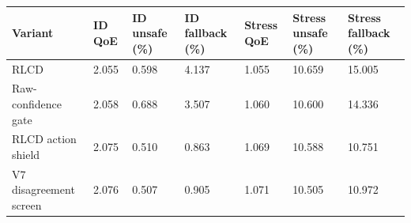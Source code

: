 \begin{tabular}{lllllll}
\toprule
Variant & ID QoE & ID unsafe (\%) & ID fallback (\%) & Stress QoE & Stress unsafe (\%) & Stress fallback (\%) \\
\midrule
RLCD & 2.055 & 0.598 & 4.137 & 1.055 & 10.659 & 15.005 \\
Raw-confidence gate & 2.058 & 0.688 & 3.507 & 1.060 & 10.600 & 14.336 \\
RLCD action shield & 2.075 & 0.510 & 0.863 & 1.069 & 10.588 & 10.751 \\
V7 disagreement screen & 2.076 & 0.507 & 0.905 & 1.071 & 10.505 & 10.972 \\
\bottomrule
\end{tabular}
